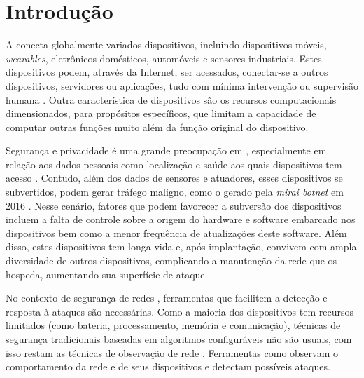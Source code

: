 
\chapter{Introdução}\label{cha:intro}

A \iot conecta globalmente variados dispositivos, incluindo dispositivos móveis,
\emph{wearables}, eletrônicos domésticos, automóveis e sensores industriais.
Estes dispositivos podem, através da Internet, ser acessados, conectar-se a
outros dispositivos, servidores ou aplicações, tudo com mínima intervenção ou
supervisão humana
\cite{Tahsien2020,abane2019,haddadpajouh2019survey,Shanbhag2015}.
Outra característica de dispositivos \iot são os recursos computacionais
dimensionados, para propósitos específicos, que limitam a capacidade de computar
outras funções muito além da função original do dispositivo.


Segurança e privacidade é uma grande preocupação em \iot, especialmente em
relação aos dados pessoais como localização e saúde aos quais dispositivos tem
acesso \cite{sengupta2020comprehensive}.
Contudo, além dos dados de sensores e atuadores, esses dispositivos se
subvertidos, podem gerar tráfego maligno, como o gerado pela \emph{mirai botnet}
em 2016 \cite{Kambourakis2017,Kolias2017mirai}.
Nesse cenário, fatores que podem favorecer a subversão dos dispositivos incluem
a falta de controle sobre a origem do hardware e software embarcado nos
dispositivos bem como a menor frequência de atualizações deste software.
Além disso, estes dispositivos tem longa vida e, após implantação, convivem com
ampla diversidade de outros dispositivos, complicando a manutenção da rede
que os hospeda, aumentando sua superfície de ataque.

No contexto de segurança de redes \iot, ferramentas que facilitem a detecção e
resposta à ataques são necessárias.
Como a maioria dos dispositivos \iot tem recursos limitados (como bateria,
processamento, memória e comunicação), técnicas de segurança tradicionais
baseadas em algoritmos configuráveis não são usuais, com isso restam as
técnicas de observação de rede \cite{Zhou2017}.
Ferramentas como \nids observam o comportamento da rede e de seus dispositivos
e detectam possíveis ataques.
% 

